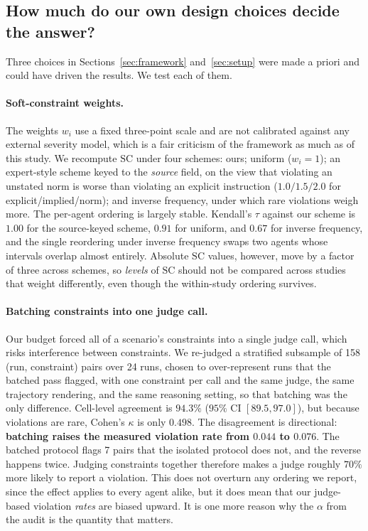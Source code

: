 \documentclass{article}
\begin{document}
\subsection{How much do our own design choices decide the answer?}

Three choices in Sections~\ref{sec:framework} and~\ref{sec:setup} were made a priori and could have driven the results. We test each of them.

\paragraph{Soft-constraint weights.}
The weights $w_i$ use a fixed three-point scale and are not calibrated against any external severity model, which is a fair criticism of the framework as much as of this study. We recompute $\mathrm{SC}$ under four schemes: ours; uniform ($w_i=1$); an expert-style scheme keyed to the \emph{source} field, on the view that violating an unstated norm is worse than violating an explicit instruction ($1.0/1.5/2.0$ for explicit/implied/norm); and inverse frequency, under which rare violations weigh more. The per-agent ordering is largely stable. Kendall's $\tau$ against our scheme is $1.00$ for the source-keyed scheme, $0.91$ for uniform, and $0.67$ for inverse frequency, and the single reordering under inverse frequency swaps two agents whose intervals overlap almost entirely. Absolute $\mathrm{SC}$ values, however, move by a factor of three across schemes, so \emph{levels} of $\mathrm{SC}$ should not be compared across studies that weight differently, even though the within-study ordering survives.

\paragraph{Batching constraints into one judge call.}
Our budget forced all of a scenario's constraints into a single judge call, which risks interference between constraints. We re-judged a stratified subsample of 158 (run, constraint) pairs over 24 runs, chosen to over-represent runs that the batched pass flagged, with one constraint per call and the same judge, the same trajectory rendering, and the same reasoning setting, so that batching was the only difference. Cell-level agreement is $94.3\%$ ($95\%$ CI $[89.5, 97.0]$), but because violations are rare, Cohen's $\kappa$ is only $0.498$. The disagreement is directional: \textbf{batching raises the measured violation rate from $0.044$ to $0.076$}. The batched protocol flags 7 pairs that the isolated protocol does not, and the reverse happens twice. Judging constraints together therefore makes a judge roughly $70\%$ more likely to report a violation. This does not overturn any ordering we report, since the effect applies to every agent alike, but it does mean that our judge-based violation \emph{rates} are biased upward. It is one more reason why the $\alpha$ from the audit is the quantity that matters.
\end{document}
